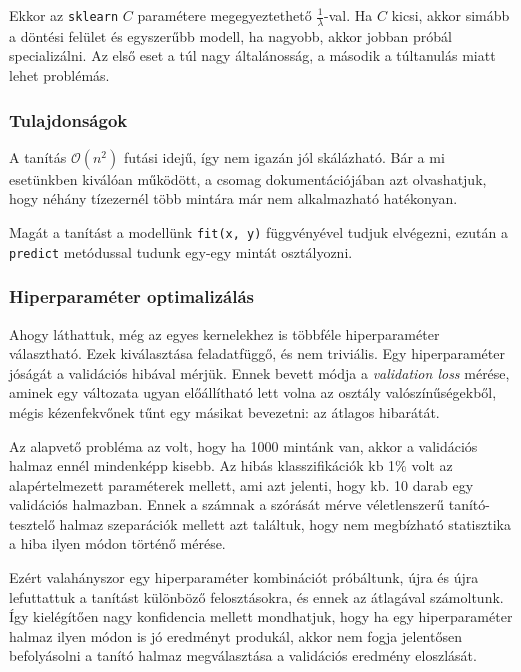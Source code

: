 \noindent
Ekkor az \texttt{sklearn} $ C $ paramétere megegyeztethető $ \frac{1}{\lambda} $-val.
Ha $ C $ kicsi, akkor simább a döntési felület és egyszerűbb modell, ha nagyobb, akkor 
jobban próbál specializálni. Az első eset a túl nagy általánosság, a második a túltanulás
miatt lehet problémás.




\subsubsection{Tulajdonságok}

\noindent
A tanítás $ \mathcal{O}(n^2) $ futási idejű, így nem igazán jól skálázható. Bár a mi 
esetünkben kiválóan működött, a csomag dokumentációjában azt olvashatjuk, hogy néhány tízezernél
több mintára már nem alkalmazható hatékonyan.


Magát a tanítást a modellünk \texttt{fit(x, y)} függvényével tudjuk elvégezni, ezután 
a \texttt{predict} metódussal tudunk egy-egy mintát osztályozni.



\subsubsection{Hiperparaméter optimalizálás}
\label{sec:svm.hiperparameter.optimalizalas}

Ahogy láthattuk, még az egyes kernelekhez is többféle hiperparaméter választható. Ezek kiválasztása
feladatfüggő, és nem triviális. Egy hiperparaméter jóságát a validációs hibával mérjük. Ennek 
bevett módja a \textit{validation loss} mérése, aminek egy változata ugyan előállítható lett volna 
az osztály valószínűségekből, mégis kézenfekvőnek tűnt egy másikat bevezetni: az átlagos hibarátát.

Az alapvető probléma az volt, hogy ha 1000 mintánk van, akkor a validációs halmaz ennél mindenképp
kisebb. Az hibás klasszifikációk kb 1\% volt az alapértelmezett paraméterek mellett, ami azt
jelenti, hogy kb. 10 darab egy validációs halmazban. Ennek a számnak a szórását mérve véletlenszerű
tanító-tesztelő halmaz szeparációk mellett azt találtuk, hogy nem megbízható statisztika a 
hiba ilyen módon történő mérése.

Ezért valahányszor egy hiperparaméter kombinációt próbáltunk, újra és újra lefuttattuk a
tanítást különböző felosztásokra, és ennek az átlagával számoltunk. Így kielégítően nagy 
konfidencia mellett mondhatjuk, hogy ha egy hiperparaméter halmaz ilyen módon is jó eredményt
produkál, akkor nem fogja jelentősen befolyásolni a tanító halmaz megválasztása a validációs 
eredmény eloszlását.

